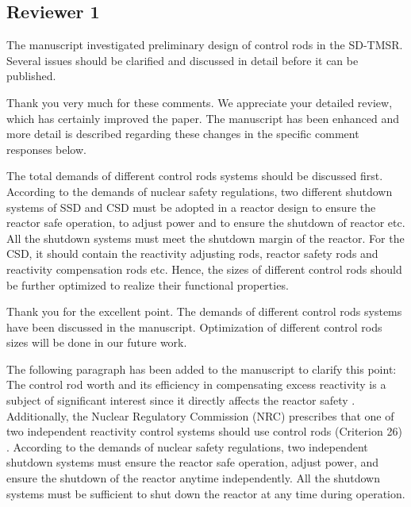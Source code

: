 \documentclass[answers,11pt]{exam}
\begin{document}
\begin{questions}
        \section*{Reviewer 1}

        \question The manuscript investigated preliminary design of control rods in the SD-TMSR. Several issues should be clarified and discussed in detail before it can be published.

        \begin{solution}
                Thank you very much for these comments. We appreciate your detailed review, which has certainly improved the paper. The manuscript has been enhanced and more detail is described regarding these changes in the specific comment responses below.
        \end{solution}


        \question  The total demands of different control rods systems should be discussed first. According to the demands of nuclear safety regulations, two different shutdown systems of SSD and CSD must be adopted in a reactor design to ensure the reactor safe operation, to adjust power and to ensure the shutdown of reactor etc. All the shutdown systems must meet the shutdown margin of the reactor. For the CSD, it should contain the reactivity adjusting rods, reactor safety rods and reactivity compensation rods etc. Hence, the sizes of different control rods should be further optimized to realize their functional properties.
        \begin{solution}
        		 
        		Thank you for the excellent point. The demands of different control rods systems have been discussed in the manuscript. Optimization of different control rods sizes will be done in our future work.
        		        		
        		The following paragraph has been added to the manuscript to clarify this point:\\
        		
The control rod worth and its efficiency in compensating excess reactivity is a subject of significant interest since it directly affects the reactor safety \cite{atkinson2019small}. Additionally, the Nuclear Regulatory Commission (NRC) prescribes that one of two independent reactivity control systems should use control rods (Criterion 26) \cite{nuclear1987standard}. According to the demands of nuclear safety regulations, two independent shutdown systems must ensure the reactor safe operation, adjust power, and ensure the shutdown of the reactor anytime independently. All the shutdown systems must be sufficient to shut down the reactor at any time during operation.
        		    

\end{solution}
\end{questions}
\end{document}
